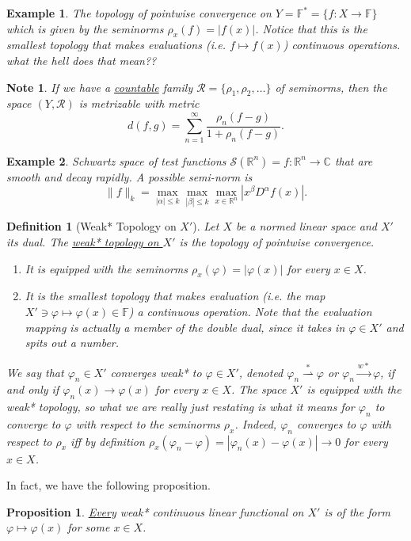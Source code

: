 \documentclass[letterpaper,twoside,11pt]{article}
\theoremstyle{mystyle}
\newtheorem{definition}{Definition}[section]
\newtheorem{prop}{Proposition}[section]
\newtheorem*{ex}{Example}
\newtheorem*{note}{Note}
\newcommand{\R}{{\mathbb R}}
\newcommand{\C}{{\mathbb C}}
\newcommand{\cg}{\color{gray}}
\newcommand{\cbk}{\color{black}}
\newcommand{\cred}{\color{red}}
\begin{document}
\begin{ex}
  The topology of pointwise convergence on $Y = \mathbb F ^*  = \{f: X \to \mathbb F\}$ which is given by the seminorms $\rho_x(f) = |f(x)|$. Notice that this is the smallest topology that makes evaluations (i.e. $f\mapsto f(x)$) continuous operations. \cred what the hell does that mean?? \cbk
\end{ex}
\begin{note}
  If we have a \underline{countable} family $\mathcal R = \{\rho_1, \rho_2,\dots\}$ of seminorms, then the space $(Y, \mathcal R)$ is metrizable with metric 
  \[d(f, g) = \sum\limits_{n=1}^\infty\frac{\rho_n(f-g)}{1+\rho_n(f-g)}.\]
\end{note}
\begin{ex}
  Schwartz space of test functions $\mathcal S(\R^n)=f:\R^n \to \C$ that are smooth and decay rapidly. A possible semi-norm is 
  \[\|f\|_k = \max_{|\alpha|\leq k}\max_{|\beta|\leq k}\max_{x\in \R^n}|x^\beta D^\alpha f(x)|.\]
\end{ex}
\begin{definition}[Weak* Topology on $X'$]
  Let $X$ be a normed linear space and $X'$ its dual. The \underline{weak* topology on $X'$} is the topology of pointwise convergence.
  \begin{enumerate}
    \item It is equipped with the seminorms $\rho_x(\varphi) = |\varphi(x)|$ for every $x\in X$. 
    \item It is the smallest topology that makes evaluation (i.e. the map $X'\ni \varphi \mapsto \varphi(x)\in \mathbb F$) a continuous operation. \cg Note that the evaluation mapping is actually a member of the double dual, since it takes in $\varphi \in X'$ and spits out a number. \cbk
  \end{enumerate}
  We say that $\varphi_n\in X' $ converges weak* to $\varphi \in X'$, denoted $\varphi_n \stackrel{\ast}{\rightharpoonup} \varphi$ or $\varphi_n \xrightarrow{w*} \varphi$, if and only if $\varphi_n(x)\to \varphi(x)$ for every $x\in X$. \cg The space $X'$ is equipped with the weak* topology, so what we are really just restating is what it means for $\varphi_n$ to converge to $\varphi$ with respect to the seminorms $\rho_x$. Indeed, $\varphi_n$ converges to $\varphi$ with respect to $\rho_x$ iff by definition $\rho_x(\varphi_n - \varphi ) = |\varphi_n(x) - \varphi(x)| \to 0$ for every $x\in X$.  \cbk
\end{definition}
In fact, we have the following proposition. 
\begin{prop}
  \underline{Every} weak* continuous linear functional on $X'$ is of the form $\varphi \mapsto \varphi(x)$ for some $x\in X$. 
\end{prop}
\end{document}
